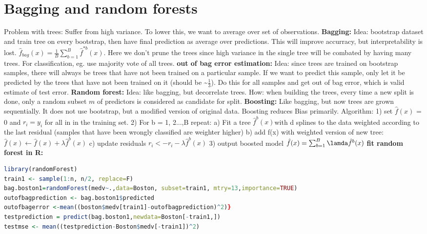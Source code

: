 \section{Bagging and random forests}
Problem with trees: Suffer from high variance. To lower this, we want to average over set of observations. 
\textbf{Bagging: } Idea: bootstrap dataset and train tree on every bootstrap, then have final prediction as average over predictions. This will improve accurracy, but interpretability is lost. $\hat f_{bag}(x)= \frac{1}{B} \sum_{b=1}^B \hat f^{*b}(x)$. Here we don't prune the trees since high variance in the single tree will be combated by having many trees. For classification, eg. use majority vote of all trees.
\textbf{out of bag error estimation: } Idea: since trees are trained on bootstrap samples, there will always be trees that have not been trained on a particular sample. If we want to predict this sample, only let it be predicted by the trees that have not been trained on it (should be \textasciitilde $\frac{1}{3}$). Do this for all samples and get out of bag error, which is valid estimate of test error. 
\textbf{Random forest: } Idea: like bagging, but decorrelate trees. How: when building the trees, every time a new split is done, only a random subset $m$ of predictors is considered as candidate for split.
\textbf{Boosting: } Like bagging, but now trees are grown sequentially. It does not use bootstrap, but a modified version of original data. Boosting reduces Bias primarily. Algorithm: 
1) set $\hat f(x)$ = 0 and $r_i = y_i$ for all in in the training set.
2) For b = 1, 2...,B repeat:
a) Fit a tree $\hat f^b(x)$with d splines to the data weighted according to the last residual (samples that have been wrongly classified are weighter higher)
b) add f(x) with weighted version of new tree: $ \hat f(x) \leftarrow \hat f(x) + \lambda \hat f^b(x) $
c) update residuals $r_i <- r_i - \lambda \hat f^b(x)$
3) output boosted model $\hat f(x) = \sum_{b=1}^B \lamda \hat f^b(x)$
\textbf{fit random forest in R: } \begin{lstlisting}[language = R]
library(randomForest)
train1 <- sample(1:n, n/2, replace=F)
bag.boston1=randomForest(medv~.,data=Boston, subset=train1, mtry=13,importance=TRUE)
outofbagprediction <- bag.boston1$predicted
outofbagerror <-mean((boston$medv[train1]-outofbagprediction)^2)}
testprediction = predict(bag.boston1,newdata=Boston[-train1,])
testmse <- mean((testprediction-Boston$medv[-train1])^2) \end{lstlisting}

